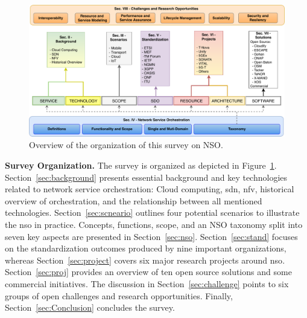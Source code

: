 \begin{figure}[t!]
  \centering
  \includegraphics[scale=.62]{Figures/01_Introduction/fig4.pdf}
    \caption{Overview of the organization of this survey on NSO.}
    \label{org}
\end{figure}

\noindent \textbf{Survey Organization.}  The survey is organized as depicted in Figure~\ref{org}. Section~\ref{sec:background} presents essential background and key technologies related to network service orchestration: Cloud computing, \gls{sdn}, \gls{nfv}, historical overview of orchestration, and the relationship between all mentioned technologies. Section~\ref{sec:scneario} outlines four potential scenarios to illustrate the \gls{nso} in practice. Concepts, functions, scope, and an NSO taxonomy split into seven key aspects are presented in Section~\ref{sec:nso}. Section~\ref{sec:stand} focuses on the standardization outcomes produced by nine important organizations,   whereas Section~\ref{sec:project} covers six major research projects around \gls{nso}. Section~\ref{sec:proj} provides an overview of ten open source solutions and some commercial initiatives.  The discussion in Section~\ref{sec:challenge} points to six groups of open challenges and research opportunities. Finally, Section~\ref{sec:Conclusion} concludes the survey.